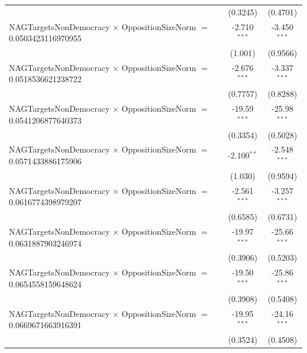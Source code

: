 \begin{tabular}{lcc}
                                                                                & (0.3245)             & (0.4701)\\   
   NAGTargetsNonDemocracy $\times$ OppositionSizeNorm $=$ 0.0503423116970955    & -2.710$^{***}$       & -3.450$^{***}$\\   
                                                                                & (1.001)              & (0.9566)\\   
   NAGTargetsNonDemocracy $\times$ OppositionSizeNorm $=$ 0.0518536621238722    & -2.676$^{***}$       & -3.337$^{***}$\\   
                                                                                & (0.7757)             & (0.8288)\\   
   NAGTargetsNonDemocracy $\times$ OppositionSizeNorm $=$ 0.0541206877640373    & -19.59$^{***}$       & -25.98$^{***}$\\   
                                                                                & (0.3354)             & (0.5028)\\   
   NAGTargetsNonDemocracy $\times$ OppositionSizeNorm $=$ 0.0571433886175906    & -2.100$^{**}$        & -2.548$^{***}$\\   
                                                                                & (1.030)              & (0.9594)\\   
   NAGTargetsNonDemocracy $\times$ OppositionSizeNorm $=$ 0.0616774398979207    & -2.561$^{***}$       & -3.257$^{***}$\\   
                                                                                & (0.6585)             & (0.6731)\\   
   NAGTargetsNonDemocracy $\times$ OppositionSizeNorm $=$ 0.0631887903246974    & -19.97$^{***}$       & -25.66$^{***}$\\   
                                                                                & (0.3906)             & (0.5203)\\   
   NAGTargetsNonDemocracy $\times$ OppositionSizeNorm $=$ 0.0654558159648624    & -19.50$^{***}$       & -25.86$^{***}$\\   
                                                                                & (0.3908)             & (0.5408)\\   
   NAGTargetsNonDemocracy $\times$ OppositionSizeNorm $=$ 0.0669671663916391    & -19.95$^{***}$       & -24.16$^{***}$\\   
                                                                                & (0.3524)             & (0.4508)\\   

\end{tabular}
